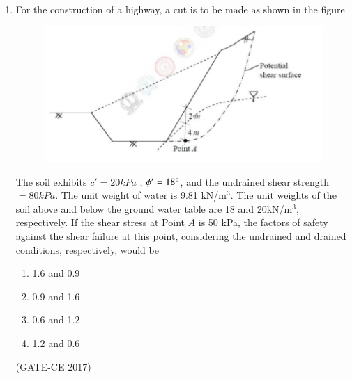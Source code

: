 \documentclass[journal,12pt,onecolumn]{article}
\theoremstyle{remark}
\begin{document}
\begin{enumerate}
    \item For the construction of a highway, a cut is to be made as shown in the figure 
    \begin{figure}[H]
    \centering
    \includegraphics[width=0.7\columnwidth]{figs/q37.jpg}  
    \caption{}
    \label{fig:9}
    \end{figure}
    The soil exhibits $c' = 20 kPa$ , $\phi' = 18\degree $, and the undrained shear strength $ = 80kPa $. The unit weight of water is 9.81 kN/m$^3$. The unit weights of the soil above and below the ground water table are 18 and 20kN/m$^3$, respectively. If the shear stress at Point $ A $ is 50 kPa, the factors of safety against the shear failure at this point, considering the undrained and drained conditions, respectively, would be
    \begin{multicols}{4}
    \begin{enumerate}
        \item 1.6 and 0.9  
        \item 0.9 and 1.6  
        \item 0.6 and 1.2  
        \item 1.2 and 0.6  
    \end{enumerate}
    \end{multicols}
    \hfill (GATE-CE 2017)


\end{enumerate}
\end{document}
